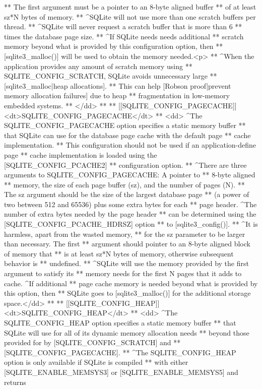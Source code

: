 \begin{Codex}[label=sqlite3.h,numbers=left]
{** The first argument must be a pointer to an 8-byte aligned buffer
** of at least sz*N bytes of memory.
** ^SQLite will not use more than one scratch buffers per thread.
** ^SQLite will never request a scratch buffer that is more than 6
** times the database page size.
** ^If SQLite needs needs additional
** scratch memory beyond what is provided by this configuration option, then 
** [sqlite3_malloc()] will be used to obtain the memory needed.<p>
** ^When the application provides any amount of scratch memory using
** SQLITE_CONFIG_SCRATCH, SQLite avoids unnecessary large
** [sqlite3_malloc|heap allocations].
** This can help [Robson proof|prevent memory allocation failures] due to heap
** fragmentation in low-memory embedded systems.
** </dd>
**
** [[SQLITE_CONFIG_PAGECACHE]] <dt>SQLITE_CONFIG_PAGECACHE</dt>
** <dd> ^The SQLITE_CONFIG_PAGECACHE option specifies a static memory buffer
** that SQLite can use for the database page cache with the default page
** cache implementation.  
** This configuration should not be used if an application-define page
** cache implementation is loaded using the [SQLITE_CONFIG_PCACHE2]
** configuration option.
** ^There are three arguments to SQLITE_CONFIG_PAGECACHE: A pointer to
** 8-byte aligned
** memory, the size of each page buffer (sz), and the number of pages (N).
** The sz argument should be the size of the largest database page
** (a power of two between 512 and 65536) plus some extra bytes for each
** page header.  ^The number of extra bytes needed by the page header
** can be determined using the [SQLITE_CONFIG_PCACHE_HDRSZ] option 
** to [sqlite3_config()].
** ^It is harmless, apart from the wasted memory,
** for the sz parameter to be larger than necessary.  The first
** argument should pointer to an 8-byte aligned block of memory that
** is at least sz*N bytes of memory, otherwise subsequent behavior is
** undefined.
** ^SQLite will use the memory provided by the first argument to satisfy its
** memory needs for the first N pages that it adds to cache.  ^If additional
** page cache memory is needed beyond what is provided by this option, then
** SQLite goes to [sqlite3_malloc()] for the additional storage space.</dd>
**
** [[SQLITE_CONFIG_HEAP]] <dt>SQLITE_CONFIG_HEAP</dt>
** <dd> ^The SQLITE_CONFIG_HEAP option specifies a static memory buffer 
** that SQLite will use for all of its dynamic memory allocation needs
** beyond those provided for by [SQLITE_CONFIG_SCRATCH] and
** [SQLITE_CONFIG_PAGECACHE].
** ^The SQLITE_CONFIG_HEAP option is only available if SQLite is compiled
** with either [SQLITE_ENABLE_MEMSYS3] or [SQLITE_ENABLE_MEMSYS5] and returns
}
\end{Codex}
